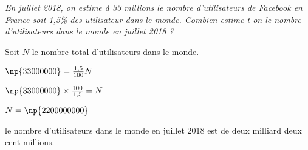 
\textit{En juillet 2018, on estime à 33 millions le nombre d'utilisateurs de Facebook en France soit 1,5\% des utilisateur dans le monde. Combien estime-t-on le nombre d'utilisateurs dans le monde en juillet 2018 ? }

 

Soit $N$ le nombre total d'utilisateurs dans le monde. 

$\np{33000000} = \frac{1,5}{100}N$

$\np{33000000} \times  \frac{100}{1,5}= N$

$N = \np{2 200 000 000}$

le nombre d'utilisateurs dans le monde en juillet 2018 est de deux milliard deux cent millions.